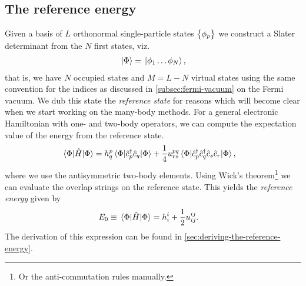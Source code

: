         \subsection{The reference energy}
            \label{subsec:reference-energy}
            Given a basis of $L$ orthonormal single-particle states
            $\left\{ \phi_p \right\}$ we construct a Slater determinant from the $N$ first
            states, viz.
            \begin{align}
                \ket*{\Phi} = \ket*{\phi_1 \dots \phi_N},
            \end{align}
            that is, we have $N$ occupied states and $M = L - N$ virtual states
            using the same convention for the indices as discussed in
            \autoref{subsec:fermi-vacuum} on the Fermi vacuum.
            We dub this state the \emph{reference state} for reasons which will
            become clear when we start working on the many-body methods.
            For a general electronic Hamiltonian with one- and two-body
            operators, we can compute the expectation value of the energy from
            the reference state.
            \begin{align}
                \mel*{\Phi}{\hat{H}}{\Phi}
                &=
                h^{p}_{q}
                \mel*{\Phi}{\hat{c}_{p}^{\dagger}\hat{c}_{q}}{\Phi}
                + \frac{1}{4}
                u^{pq}_{rs}
                \mel*{\Phi}{\hat{c}_{p}^{\dagger}\hat{c}_{q}^{\dagger}\hat{c}_{s}\hat{c}_{r}}{\Phi},
            \end{align}
            where we use the antisymmetric two-body elements.
            Using Wick's theorem\footnote{%
                Or the anti-commutation rules manually.
            } we can evaluate the overlap strings on the reference state.
            This yields the \emph{reference energy} given by
            \begin{align}
                E_{0}
                &\equiv
                \mel*{\Phi}{\hat{H}}{\Phi}
                =
                h^{i}_{i}
                + \frac{1}{2}u^{ij}_{ij}.
                \label{eq:reference-energy}
            \end{align}
            The derivation of this expression can be found in
            \autoref{sec:deriving-the-reference-energy}.


